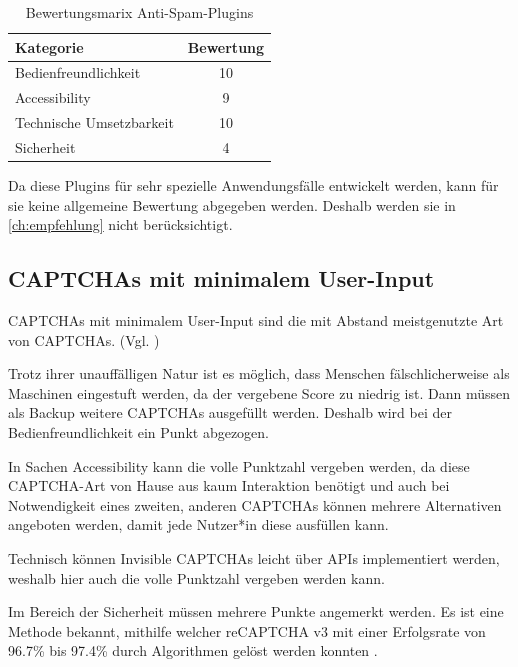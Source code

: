 \begin{table}[h!]
    \caption{Bewertungsmarix Anti-Spam-Plugins}
    \begin{center}
        \begin{tabular}{l|c}
            Kategorie                       & Bewertung \\\hline
            Bedienfreundlichkeit            & 10         \\
            Accessibility                   & 9        \\
            Technische Umsetzbarkeit        & 10         \\
            Sicherheit                      & 4         
        \end{tabular}
    \end{center}
\end{table} 

Da diese Plugins für sehr spezielle Anwendungsfälle entwickelt werden,
kann für sie keine allgemeine Bewertung abgegeben werden.
Deshalb werden sie in \autoref{ch:empfehlung} nicht berücksichtigt.

\subsection{CAPTCHAs mit minimalem User-Input}
CAPTCHAs mit minimalem User-Input sind die mit Abstand meistgenutzte Art von CAPTCHAs. (Vgl. \cite{stats})

Trotz ihrer unauffälligen Natur ist es möglich, dass Menschen fälschlicherweise als Maschinen eingestuft werden,
da der vergebene Score zu niedrig ist. 
Dann müssen als Backup weitere CAPTCHAs ausgefüllt werden.
Deshalb wird bei der Bedienfreundlichkeit ein Punkt abgezogen.

In Sachen Accessibility kann die volle Punktzahl vergeben werden,
da diese CAPTCHA-Art von Hause aus kaum Interaktion benötigt und auch bei Notwendigkeit eines zweiten, anderen CAPTCHAs
können mehrere Alternativen angeboten werden, damit jede Nutzer*in diese ausfüllen kann.

Technisch können Invisible CAPTCHAs leicht über APIs implementiert werden, weshalb hier auch die volle Punktzahl vergeben werden kann.

Im Bereich der Sicherheit müssen mehrere Punkte angemerkt werden.
Es ist eine Methode bekannt, mithilfe welcher reCAPTCHA v3 mit einer Erfolgsrate von 96.7\% bis 97.4\% durch Algorithmen gelöst werden konnten
\cite{DBLP:journals/corr/abs-1903-01003}.

